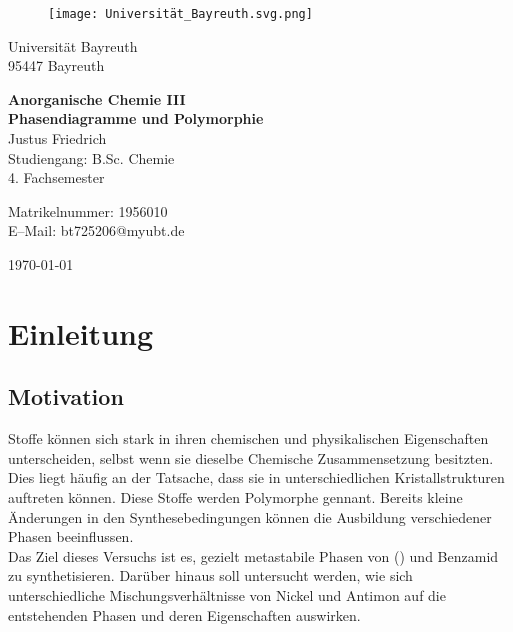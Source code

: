 \documentclass[12pt, a4paper]{article}
\begin{document}
\begin{figure}
    \texttt{[image: Universität\_Bayreuth.svg.png]}
\end{figure}



{\raggedright Universität Bayreuth\\  95447 Bayreuth}


\vspace{5cm}

\begin{center}
{\LARGE\bf{Anorganische Chemie III}} \\  
\vspace{1cm}
{\Large\bf{Phasendiagramme und Polymorphie}}\\
\vspace{0.5cm}
{\large Justus Friedrich\\}
{Studiengang: B.Sc. Chemie\\}
{4. Fachsemester}
\end{center}





\thispagestyle{empty}
\begin{center}
{\small Matrikelnummer: 1956010 \\
E–Mail:  bt725206@myubt.de}
\end{center}

\vspace{5cm}

\today


\newpage
\tableofcontents
\thispagestyle{empty}


\newpage
\setcounter{page}{1}
\section{Einleitung}



\subsection{Motivation}
Stoffe können sich stark in ihren chemischen und physikalischen Eigenschaften unterscheiden, selbst wenn sie dieselbe Chemische Zusammensetzung besitzten. Dies liegt häufig an der Tatsache, dass sie in unterschiedlichen Kristallstrukturen auftreten können. Diese Stoffe werden Polymorphe gennant. Bereits kleine Änderungen in den Synthesebedingungen können die Ausbildung verschiedener Phasen beeinflussen. \\
\noindent
Das Ziel dieses Versuchs ist es, gezielt metastabile Phasen von () und Benzamid zu synthetisieren. Darüber hinaus soll untersucht werden, wie sich unterschiedliche Mischungsverhältnisse von Nickel und Antimon auf die entstehenden Phasen und deren Eigenschaften auswirken.\cite{Skript}
\end{document}
